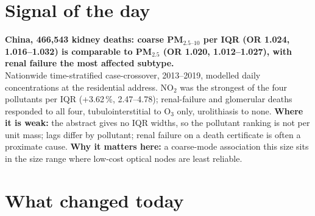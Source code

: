 \documentclass[10pt]{article}
\begin{document}
\vspace{6mm}

\section*{\sffamily\bfseries\color{Deep}Signal of the day}
\vspace{-1.5mm}{\color{Amber}\rule{\linewidth}{1.1pt}}\vspace{2.5mm}

\begin{keybox}
{\sffamily\bfseries\small\color{Deep}China, 466,543 kidney deaths: coarse PM$_{2.5\text{--}10}$ per IQR (OR 1.024,
1.016--1.032) is comparable to PM$_{2.5}$ (OR 1.020, 1.012--1.027), with renal failure the most affected subtype.}\\[1.4mm]
\footnotesize
Nationwide time-stratified case-crossover, 2013--2019, modelled daily concentrations at the residential address. NO$_2$ was the
strongest of the four pollutants per IQR (+3.62\,\%, 2.47--4.78); renal-failure and glomerular deaths responded to all four,
tubulointerstitial to O$_3$ only, urolithiasis to none.
\textbf{Where it is weak:} the abstract gives no IQR widths, so the pollutant ranking is not per unit mass; lags differ by pollutant;
renal failure on a death certificate is often a proximate cause.
\textbf{Why it matters here:} a coarse-mode association this size sits in the size range where low-cost optical nodes are least reliable.\par
\end{keybox}

\vspace{3mm}

\section*{\sffamily\bfseries\color{Deep}What changed today}
\vspace{-1.5mm}{\color{Amber}\rule{\linewidth}{1.1pt}}\vspace{2.5mm}
\end{document}
